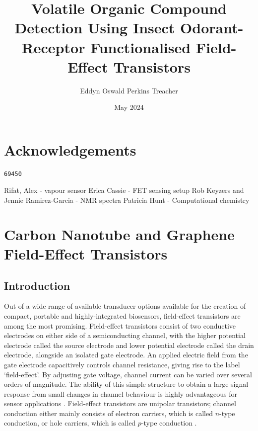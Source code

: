 \documentclass[
  a4paper,
]{scrbook}
\title{Volatile Organic Compound Detection Using Insect Odorant-Receptor
Functionalised Field-Effect Transistors}
\author{Eddyn Oswald Perkins Treacher}
\date{May 2024}
\renewcommand*\contentsname{Table of contents}
\newcommand\contentsname{Table of contents}
\begin{document}
\frontmatter
\maketitle
\ifdefined\Shaded\renewenvironment{Shaded}{\begin{tcolorbox}[breakable, sharp corners, interior hidden, enhanced, frame hidden, boxrule=0pt, borderline west={3pt}{0pt}{shadecolor}]}{\end{tcolorbox}}\fi

\renewcommand*\contentsname{Table of contents}
{
\setcounter{tocdepth}{2}
\tableofcontents
}
\mainmatter
{}

\hypertarget{acknowledgements}{%
\chapter*{Acknowledgements}\label{acknowledgements}}


\begin{verbatim}
69450
\end{verbatim}

Rifat, Alex - vapour sensor Erica Cassie - FET sensing setup Rob Keyzers
and Jennie Ramirez-Garcia - NMR spectra Patricia Hunt - Computational
chemistry


\hypertarget{carbon-nanotube-and-graphene-field-effect-transistors}{%
\chapter{Carbon Nanotube and Graphene Field-Effect
Transistors}\label{carbon-nanotube-and-graphene-field-effect-transistors}}

\hypertarget{introduction}{%
\section{Introduction}\label{introduction}}

Out of a wide range of available transducer options available for the
creation of compact, portable and highly-integrated biosensors,
field-effect transistors are among the most promising. Field-effect
transistors consist of two conductive electrodes on either side of a
semiconducting channel, with the higher potential electrode called the
source electrode and lower potential electrode called the drain
electrode, alongside an isolated gate electrode. An applied electric
field from the gate electrode capacitively controls channel resistance,
giving rise to the label `field-effect'. By adjusting gate voltage,
channel current can be varied over several orders of magnitude. The
ability of this simple structure to obtain a large signal response from
small changes in channel behaviour is highly advantageous for sensor
applications \autocite{Shkodra2021,Yao2021}. Field-effect transistors
are unipolar transistors; channel conduction either mainly consists of
electron carriers, which is called \(n\)-type conduction, or hole
carriers, which is called \(p\)-type conduction \autocite{Yao2021}.
\end{document}

